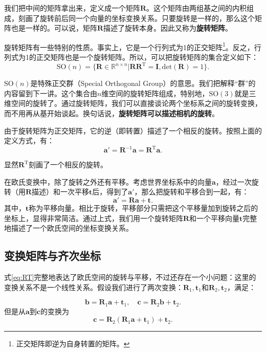 我们把中间的矩阵拿出来，定义成一个矩阵$\bm{R}$。这个矩阵由两组基之间的内积组成，刻画了旋转前后同一个向量的坐标变换关系。只要旋转是一样的，那么这个矩阵也是一样的。可以说，矩阵$\bm{R}$描述了旋转本身。因此又称为\textbf{旋转矩阵}。

旋转矩阵有一些特别的性质。事实上，它是一个行列式为1的正交矩阵\footnote{正交矩阵即逆为自身转置的矩阵。}。反之，行列式为1的正交矩阵也是一个旋转矩阵。所以，可以把旋转矩阵的集合定义如下：
\begin{equation}
\mathrm{SO}(n) = \{ \bm{R} \in \mathbb{R}^{n \times n} | \bm{R R}^\mathrm{T} = \bm{I}, \mathrm{det} (\bm{R})=1 \}.
\end{equation}

$\mathrm{SO}(n)$是特殊正交群（Special Orthogonal Group）的意思。我们把解释“群”的内容留到下一讲。这个集合由$n$维空间的旋转矩阵组成，特别地，$\mathrm{SO}(3)$就是三维空间的旋转了。通过旋转矩阵，我们可以直接谈论两个坐标系之间的旋转变换，而不用再从基开始谈起。换句话说，\textbf{旋转矩阵可以描述相机的旋转}。

由于旋转矩阵为正交矩阵，它的逆（即转置）描述了一个相反的旋转。按照上面的定义方式，有：
\begin{equation}
\bm{a}' = \bm{R}^{-1} \bm{a} =\bm{R}^\mathrm{T} \bm{a} .
\end{equation}

显然$\bm{R}^\mathrm{T}$刻画了一个相反的旋转。

在欧氏变换中，除了旋转之外还有平移。考虑世界坐标系中的向量$\bm{a}$，经过一次旋转（用$\bm{R}$描述）和一次平移$\bm{t}$后，得到了$\bm{a}'$，那么把旋转和平移合到一起，有：
\begin{equation}
\label{eq:RT}
\bm{a}' = \bm{R} \bm{a} + \bm{t}.
\end{equation}
其中，$\bm{t}$称为平移向量。相比于旋转，平移部分只需把这个平移量加到旋转之后的坐标上，显得非常简洁。通过上式，我们用一个旋转矩阵$\bm{R}$和一个平移向量$\bm{t}$完整地描述了一个欧氏空间的坐标变换关系。

\subsection{变换矩阵与齐次坐标}

式\eqref{eq:RT}完整地表达了欧氏空间的旋转与平移，不过还存在一个小问题：这里的变换关系不是一个线性关系。假设我们进行了两次变换：$\bm{R}_1,\bm{t}_1$和$\bm{R}_2,\bm{t}_2$，满足：

\[
\bm{b} = {\bm{R}_1} \bm{a} + {\bm{t}_1}, \quad \bm{c} = {\bm{R}_2} \bm{b} + {\bm{t}_2}.
\]
但是从$\bm{a}$到$\bm{c}$的变换为
\[
\bm{c} = {\bm{R}_2}\left( {{\bm{R}_1} \bm{a} + {\bm{t}_1}} \right) + {\bm{t}_2}.
\]

